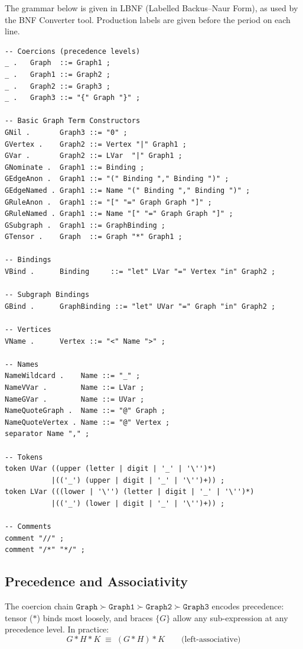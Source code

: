 \documentclass[11pt, a4paper]{article}
\theoremstyle{definition}
\theoremstyle{plain}
\theoremstyle{remark}
\begin{document}
The grammar below is given in LBNF (Labelled Backus--Naur Form), as used by the
BNF Converter tool.  Production labels are given before the period on each
line.

\begin{lstlisting}[style=bnf, caption={Complete LBNF grammar of the graph DSL}]
-- Coercions (precedence levels)
_ .   Graph  ::= Graph1 ;
_ .   Graph1 ::= Graph2 ;
_ .   Graph2 ::= Graph3 ;
_ .   Graph3 ::= "{" Graph "}" ;

-- Basic Graph Term Constructors
GNil .       Graph3 ::= "0" ;
GVertex .    Graph2 ::= Vertex "|" Graph1 ;
GVar .       Graph2 ::= LVar  "|" Graph1 ;
GNominate .  Graph1 ::= Binding ;
GEdgeAnon .  Graph1 ::= "(" Binding "," Binding ")" ;
GEdgeNamed . Graph1 ::= Name "(" Binding "," Binding ")" ;
GRuleAnon .  Graph1 ::= "[" "=" Graph Graph "]" ;
GRuleNamed . Graph1 ::= Name "[" "=" Graph Graph "]" ;
GSubgraph .  Graph1 ::= GraphBinding ;
GTensor .    Graph  ::= Graph "*" Graph1 ;

-- Bindings
VBind .      Binding     ::= "let" LVar "=" Vertex "in" Graph2 ;

-- Subgraph Bindings
GBind .      GraphBinding ::= "let" UVar "=" Graph "in" Graph2 ;

-- Vertices
VName .      Vertex ::= "<" Name ">" ;

-- Names
NameWildcard .    Name ::= "_" ;
NameVVar .        Name ::= LVar ;
NameGVar .        Name ::= UVar ;
NameQuoteGraph .  Name ::= "@" Graph ;
NameQuoteVertex . Name ::= "@" Vertex ;
separator Name "," ;

-- Tokens
token UVar ((upper (letter | digit | '_' | '\'')*)
           |(('_') (upper | digit | '_' | '\'')+)) ;
token LVar (((lower | '\'') (letter | digit | '_' | '\'')*)
           |(('_') (lower | digit | '_' | '\'')+)) ;

-- Comments
comment "//" ;
comment "/*" "*/" ;
\end{lstlisting}

\subsection{Precedence and Associativity}

The coercion chain $\mathtt{Graph} \succ \mathtt{Graph1} \succ \mathtt{Graph2}
\succ \mathtt{Graph3}$ encodes precedence: tensor ($*$) binds most loosely, and
braces $\{G\}$ allow any sub-expression at any precedence level.  In practice:
\[
  G * H * K \;\equiv\; (G * H) * K
  \qquad\text{(left-associative)}
\]
\end{document}
